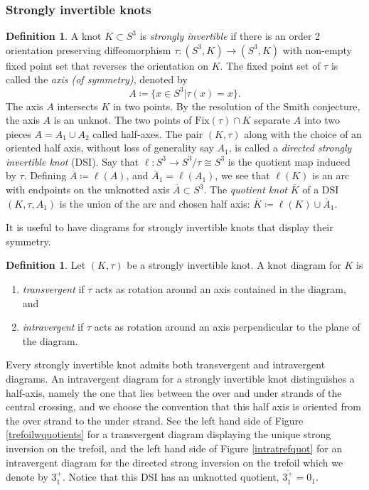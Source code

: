 \documentclass[11pt]{amsart}
\theoremstyle{definition}
\newtheorem{definition}[theorem]{Definition}
\theoremstyle{remark}
\numberwithin{equation}{section}
\begin{document}
\subsubsection{Strongly invertible knots}
\begin{definition}\label{defstroquot} A knot $K\subset S^3$ is \emph{strongly invertible} if there is an order 2 orientation preserving diffeomorphism $\tau\colon (S^3,K)\to (S^3, K)$ with non-empty fixed point set that reverses the orientation on $K$. The fixed point set of $\tau$ is called the \emph{axis (of symmetry)}, denoted by \[A\coloneq \{x\in S^3|\tau(x)=x\}.\] The axis $A$ intersects $K$ in two points. By the resolution of the Smith conjecture, the axis $A$ is an unknot. The two points of $\textrm{Fix}(\tau)\cap K$ separate $A$ into two pieces $A=A_1\cup A_2$ called half-axes. The pair $(K,\tau)$ along with the choice of an oriented half axis, without loss of generality say $A_1$, is called a \emph{directed strongly invertible knot} (DSI). Say that $\ell\colon S^3\to S^3/ \tau\cong S^3$ is the quotient map induced by $\tau$. Defining $\overline{A}\coloneq \ell(A)$, and $\overline{A}_1=\ell(A_1)$, we see that $\ell(K)$ is an arc with endpoints on the unknotted axis $\overline{A}\subset S^3$. The \emph{quotient knot} $\overline{K}$ of a DSI $(K,\tau,A_1)$ is the union of the arc and chosen half axis: $\overline{K}\coloneq \ell(K)\cup \overline{A}_1$.
\end{definition}
It is useful to have diagrams for strongly invertible knots that display their symmetry.
\begin{definition}\cite[~Definition 3.3]{BoyAhE4G}\label{trans&intra}
Let $(K,\tau)$ be a strongly invertible knot. A knot diagram for $K$ is 
\begin{enumerate}
    \item \emph{transvergent} if $\tau$ acts as rotation around an axis contained in the diagram, and
    \item \emph{intravergent} if $\tau$ acts as rotation around an axis perpendicular to the plane of the diagram. 
\end{enumerate} 
\end{definition}

Every strongly invertible knot admits both transvergent and intravergent diagrams.
An intravergent diagram for a strongly invertible knot distinguishes a half-axis, namely the one that lies between the over and under strands of the central crossing, and we choose the convention that this half axis is oriented from the over strand to the under strand. See the left hand side of Figure \ref{trefoilwquotients} for a transvergent diagram displaying the unique strong inversion on the trefoil, and the left hand side of Figure \ref{intratrefquot} for an intravergent diagram for the directed strong inversion on the trefoil which we denote by $3_1^+.$ Notice that this DSI has an unknotted quotient, $\overline{3_1^+}=0_1$.
\end{document}
